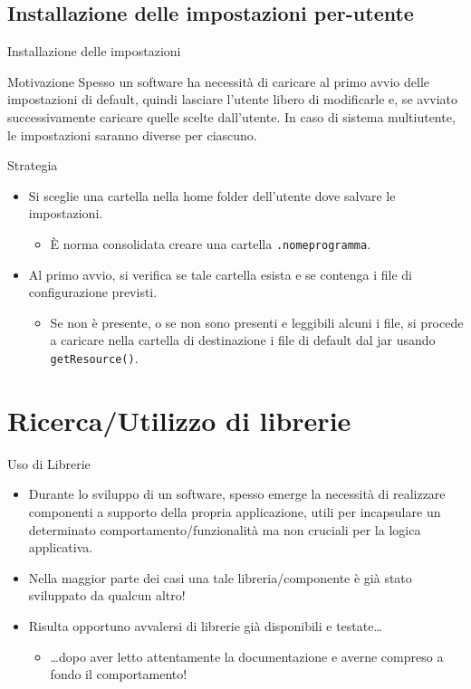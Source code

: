 \documentclass[presentation]{beamer}
\begin{document}
\subsection{Installazione delle impostazioni per-utente}

\begin{frame}{Installazione delle impostazioni}
\begin{block}{Motivazione}
Spesso un software ha necessità di caricare al primo avvio delle impostazioni di default, quindi lasciare l'utente libero di modificarle e, se avviato successivamente caricare quelle scelte dall'utente. In caso di sistema multiutente, le impostazioni saranno diverse per ciascuno.
\end{block}

\begin{block}{Strategia}
\begin{itemize}
\item Si sceglie una cartella nella home folder dell'utente dove salvare le impostazioni. 
\begin{itemize}
\item È norma consolidata creare una cartella \texttt{.nomeprogramma}.
\end{itemize}

\item Al primo avvio, si verifica se tale cartella esista e se contenga i file di configurazione previsti.
\begin{itemize}
\item Se non è presente, o se non sono presenti e leggibili alcuni i file, si procede a caricare 
nella cartella di destinazione i file di default dal jar usando \texttt{getResource()}.
\end{itemize}
\end{itemize}
\end{block}
\end{frame}

\section{Ricerca/Utilizzo di librerie}
\begin{frame}{Uso di Librerie}
	\begin{itemize}\itemsep15pt
		\item Durante lo sviluppo di un software, spesso emerge la necessità di realizzare componenti a supporto della propria applicazione, utili per incapsulare un determinato comportamento/funzionalità ma non cruciali per la logica applicativa.
		\item Nella maggior parte dei casi una tale libreria/componente è già stato sviluppato da qualcun altro!
		\item Risulta opportuno avvalersi di librerie già disponibili e testate\dots
		\begin{itemize}
			\item \dots dopo aver letto attentamente la documentazione e averne compreso a fondo il comportamento!
		\end{itemize}
	\end{itemize}
\end{frame}
\end{document}
